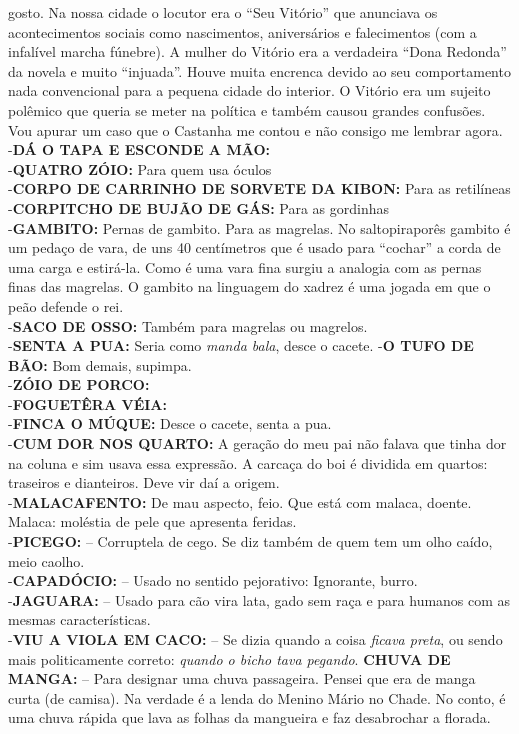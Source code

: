 \documentclass[12pt,brazil,]{book}
\begin{document}
\begin{itemize}
  gosto. Na nossa cidade o locutor era o ``Seu Vitório'' que anunciava
  os acontecimentos sociais como nascimentos, aniversários e
  falecimentos (com a infalível marcha fúnebre). A mulher do Vitório era
  a verdadeira ``Dona Redonda'' da novela e muito ``injuada''. Houve
  muita encrenca devido ao seu comportamento nada convencional para a
  pequena cidade do interior. O Vitório era um sujeito polêmico que
  queria se meter na política e também causou grandes confusões. Vou
  apurar um caso que o Castanha me contou e não consigo me lembrar
  agora.\\
  -\textbf{DÁ O TAPA E ESCONDE A MÃO:}\\
  -\textbf{QUATRO ZÓIO:} Para quem usa óculos\\
  -\textbf{CORPO DE CARRINHO DE SORVETE DA KIBON:} Para as retilíneas\\
  -\textbf{CORPITCHO DE BUJÃO DE GÁS:} Para as gordinhas\\
  -\textbf{GAMBITO:} Pernas de gambito. Para as magrelas. No
  saltopiraporês gambito é um pedaço de vara, de uns 40 centímetros que
  é usado para ``cochar'' a corda de uma carga e estirá-la. Como é uma
  vara fina surgiu a analogia com as pernas finas das magrelas. O
  gambito na linguagem do xadrez é uma jogada em que o peão defende o
  rei.\\
  -\textbf{SACO DE OSSO:} Também para magrelas ou magrelos.\\
  -\textbf{SENTA A PUA:} Seria como \emph{manda bala}, desce o cacete.
  -\textbf{O TUFO DE BÃO:} Bom demais, supimpa.\\
  -\textbf{ZÓIO DE PORCO:}\\
  -\textbf{FOGUETÊRA VÉIA:}\\
  -\textbf{FINCA O MÚQUE:} Desce o cacete, senta a pua.\\
  -\textbf{CUM DOR NOS QUARTO:} A geração do meu pai não falava que
  tinha dor na coluna e sim usava essa expressão. A carcaça do boi é
  dividida em quartos: traseiros e dianteiros. Deve vir daí a origem.\\
  -\textbf{MALACAFENTO:} De mau aspecto, feio. Que está com malaca,
  doente. Malaca: moléstia de pele que apresenta feridas.\\
  -\textbf{PICEGO:} -- Corruptela de cego. Se diz também de quem tem um
  olho caído, meio caolho.\\
  -\textbf{CAPADÓCIO:} -- Usado no sentido pejorativo: Ignorante,
  burro.\\
  -\textbf{JAGUARA:} -- Usado para cão vira lata, gado sem raça e para
  humanos com as mesmas características.\\
  -\textbf{VIU A VIOLA EM CACO:} -- Se dizia quando a coisa \emph{ficava
  preta}, ou sendo mais politicamente correto: \emph{quando o bicho tava
  pegando}. \textbf{CHUVA DE MANGA:} -- Para designar uma chuva
  passageira. Pensei que era de manga curta (de camisa). Na verdade é a
  lenda do Menino Mário no Chade. No conto, é uma chuva rápida que lava
  as folhas da mangueira e faz desabrochar a florada.
\end{itemize}
\end{document}
